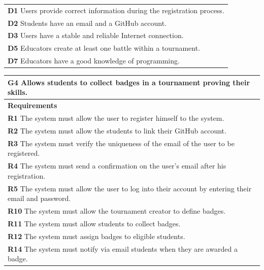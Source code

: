 \begin{table}[H]
\begin{tabularx}{\textwidth}{X}
        \textbf{D1} Users provide correct information during the registration process. \\           
        \textbf{D2} Students have an email and a GitHub account.     \\
        \textbf{D3} Users have a stable and reliable Internet connection. \\
        \textbf{D5} Educators create at least one battle within a tournament.        \\
        \textbf{D7} Educators have a good knowledge of programming.      \\
        \bottomrule
    \end{tabularx}
\end{table}

\begin{table}[H]
    \begin{tabularx}{\textwidth}{X}
        \toprule
        \textbf{G4} Allows students to collect badges in a tournament proving their skills.                                       \\ \midrule
        \textbf{Requirements}                                                                                                        \\ \midrule
        \textbf{R1} The system must allow the user to register himself to the system.                                                  \\
        \textbf{R2} The system must allow the students to link their GitHub account.                                               \\ 
        \textbf{R3} The system must verify the uniqueness of the email of the user to be registered.                                        \\ 
        \textbf{R4} The system must send a confirmation on the user's email after his registration.                         \\ 
        \textbf{R5} The system must allow the user to log into their account by entering their email and password.           \\ 
        \textbf{R10} The system must allow the tournament creator to define badges.      \\ 
        \textbf{R11} The system must allow students to collect badges.       \\ 
        \textbf{R12} The system must assign badges to eligible students.          \\  
        \textbf{R14} The system must notify via email students when they are awarded a badge. \\ 

\end{tabularx}
\end{table}
